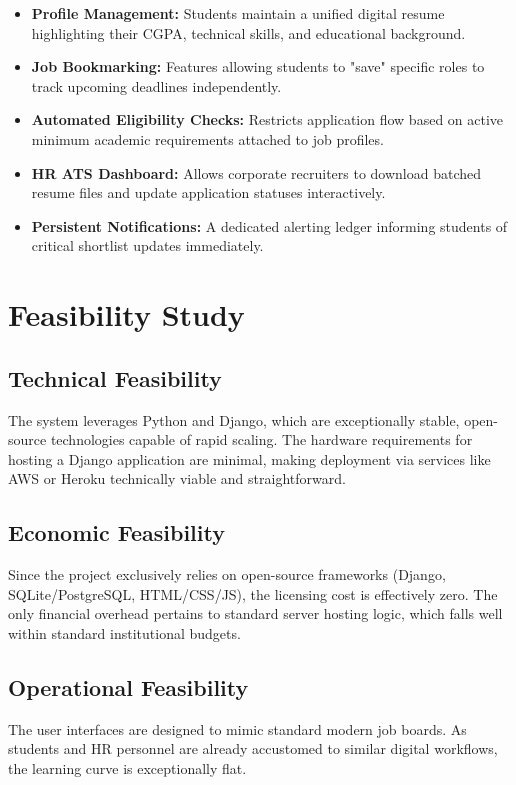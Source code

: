 \documentclass[a4paper,12pt]{report}
\begin{document}
\begin{itemize}
    \item \textbf{Profile Management:} Students maintain a unified digital resume highlighting their CGPA, technical skills, and educational background.
    \item \textbf{Job Bookmarking:} Features allowing students to "save" specific roles to track upcoming deadlines independently.
    \item \textbf{Automated Eligibility Checks:} Restricts application flow based on active minimum academic requirements attached to job profiles.
    \item \textbf{HR ATS Dashboard:} Allows corporate recruiters to download batched resume files and update application statuses interactively.
    \item \textbf{Persistent Notifications:} A dedicated alerting ledger informing students of critical shortlist updates immediately.
\end{itemize}

\section{Feasibility Study}

\subsection{Technical Feasibility}
The system leverages Python and Django, which are exceptionally stable, open-source technologies capable of rapid scaling. The hardware requirements for hosting a Django application are minimal, making deployment via services like AWS or Heroku technically viable and straightforward.

\subsection{Economic Feasibility}
Since the project exclusively relies on open-source frameworks (Django, SQLite/PostgreSQL, HTML/CSS/JS), the licensing cost is effectively zero. The only financial overhead pertains to standard server hosting logic, which falls well within standard institutional budgets.

\subsection{Operational Feasibility}
The user interfaces are designed to mimic standard modern job boards. As students and HR personnel are already accustomed to similar digital workflows, the learning curve is exceptionally flat.
\end{document}
